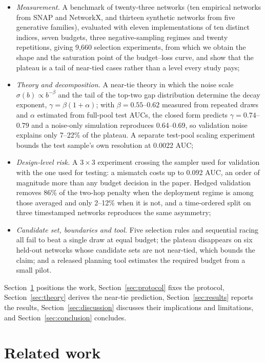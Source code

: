 \documentclass{comjnl}
\begin{document}
\begin{itemize}
\item \emph{Measurement.} A benchmark of twenty-three networks (ten empirical networks from SNAP and NetworkX, and thirteen synthetic networks from five generative families), evaluated with eleven implementations of ten distinct indices, seven budgets, three negative-sampling regimes and twenty repetitions, giving 9{,}660 selection experiments, from which we obtain the shape and the saturation point of the budget--loss curve, and show that the plateau is a tail of near-tied cases rather than a level every study pays;
\item \emph{Theory and decomposition.} A near-tie theory in which the noise scale $\sigma(b)\propto b^{-\beta}$ and the tail of the top-two gap distribution determine the decay exponent, $\gamma=\beta(1+\alpha)$; with $\beta=0.55$--$0.62$ measured from repeated draws and $\alpha$ estimated from full-pool test AUCs, the closed form predicts $\gamma=0.74$--$0.79$ and a noise-only simulation reproduces 0.64--0.69, so validation noise explains only 7--22\% of the plateau. A separate test-pool scaling experiment bounds the test sample's own resolution at 0.0022 AUC;
\item \emph{Design-level risk.} A $3\times3$ experiment crossing the sampler used for validation with the one used for testing: a mismatch costs up to 0.092 AUC, an order of magnitude more than any budget decision in the paper. Hedged validation removes 86\% of the two-hop penalty when the deployment regime is among those averaged and only 2--12\% when it is not, and a time-ordered split on three timestamped networks reproduces the same asymmetry;
\item \emph{Candidate set, boundaries and tool.} Five selection rules and sequential racing all fail to beat a single draw at equal budget; the plateau disappears on six held-out networks whose candidate sets are not near-tied, which bounds the claim; and a released planning tool estimates the required budget from a small pilot.
\end{itemize}

Section~\ref{sec:related} positions the work, Section~\ref{sec:protocol} fixes the protocol, Section~\ref{sec:theory} derives the near-tie prediction, Section~\ref{sec:results} reports the results, Section~\ref{sec:discussion} discusses their implications and limitations, and Section~\ref{sec:conclusion} concludes.

\section{Related work}
\label{sec:related}
\end{document}
